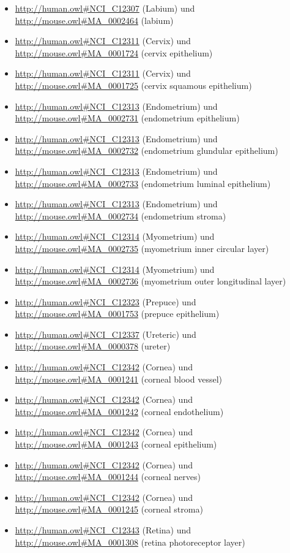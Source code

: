 \begin{itemize}
	\item \url{http://human.owl#NCI_C12307} (Labium\textunderscoreMinus) und \url{http://mouse.owl#MA_0002464} (labium)
	\item \url{http://human.owl#NCI_C12311} (Cervix) und \url{http://mouse.owl#MA_0001724} (cervix epithelium)
	\item \url{http://human.owl#NCI_C12311} (Cervix) und \url{http://mouse.owl#MA_0001725} (cervix squamous epithelium)
	\item \url{http://human.owl#NCI_C12313} (Endometrium) und \url{http://mouse.owl#MA_0002731} (endometrium epithelium)
	\item \url{http://human.owl#NCI_C12313} (Endometrium) und \url{http://mouse.owl#MA_0002732} (endometrium glundular epithelium)
	\item \url{http://human.owl#NCI_C12313} (Endometrium) und \url{http://mouse.owl#MA_0002733} (endometrium luminal epithelium)
	\item \url{http://human.owl#NCI_C12313} (Endometrium) und \url{http://mouse.owl#MA_0002734} (endometrium stroma)
	\item \url{http://human.owl#NCI_C12314} (Myometrium) und \url{http://mouse.owl#MA_0002735} (myometrium inner circular layer)
	\item \url{http://human.owl#NCI_C12314} (Myometrium) und \url{http://mouse.owl#MA_0002736} (myometrium outer longitudinal layer)
	\item \url{http://human.owl#NCI_C12323} (Prepuce) und \url{http://mouse.owl#MA_0001753} (prepuce epithelium)
	\item \url{http://human.owl#NCI_C12337} (Ureteric\textunderscoreOrifice) und \url{http://mouse.owl#MA_0000378} (ureter)
	\item \url{http://human.owl#NCI_C12342} (Cornea) und \url{http://mouse.owl#MA_0001241} (corneal blood vessel)
	\item \url{http://human.owl#NCI_C12342} (Cornea) und \url{http://mouse.owl#MA_0001242} (corneal endothelium)
	\item \url{http://human.owl#NCI_C12342} (Cornea) und \url{http://mouse.owl#MA_0001243} (corneal epithelium)
	\item \url{http://human.owl#NCI_C12342} (Cornea) und \url{http://mouse.owl#MA_0001244} (corneal nerves)
	\item \url{http://human.owl#NCI_C12342} (Cornea) und \url{http://mouse.owl#MA_0001245} (corneal stroma)
	\item \url{http://human.owl#NCI_C12343} (Retina) und \url{http://mouse.owl#MA_0001308} (retina photoreceptor layer)

\end{itemize}
